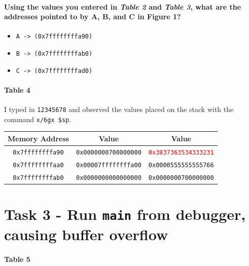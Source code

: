 \documentclass[12pt, letterpaper]{article}
\begin{document}
\subsection*{Using the values you entered in \textit{Table 2} and \textit{Table 3}, what are the addresses pointed to by A, B, and C in Figure 1?}

\begin{itemize}
    \item \texttt{A -> (0x7ffffffffa90)}
    \item \texttt{B -> (0x7ffffffffab0)}
    \item \texttt{C -> (0x7ffffffffad0)}
\end{itemize}

\subsection*{Table 4}

I typed in \texttt{12345678} and observed the values placed on the stack with the command \texttt{x/6gx \$sp}.

\begin{table}[h]
    \begin{center}
        \begin{tabular}{|c|c|c|}
            \hline
            \textbf{Memory Address} & \textbf{Value} & \textbf{Value} \\
            \hline
            \texttt{0x7ffffffffa90} & \texttt{0x0000000700000000} & \textcolor{red}{\texttt{0x3837363534333231}} \\
            \hline
            \texttt{0x7ffffffffaa0} & \texttt{0x00007ffffffffa00} & \texttt{0x0000555555555766} \\
            \hline
            \texttt{0x7ffffffffab0} & \texttt{0x0000000000000000} & \texttt{0x0000000700000000} \\
            \hline
        \end{tabular}
    \end{center}
\end{table}
\FloatBarrier

\part*{Task 3 - Run \texttt{main} from debugger, causing buffer overflow}

\subsection*{Table 5}
\end{document}
